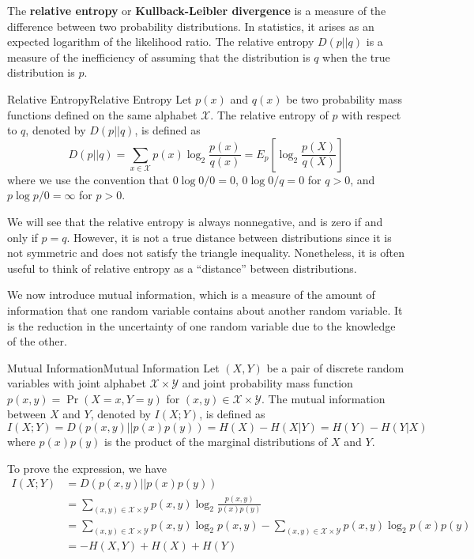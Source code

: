 \documentclass[../main.tex]{subfiles}
\begin{document}
The \textbf{relative entropy} or \textbf{Kullback-Leibler divergence} is a measure of the difference between two probability distributions. In statistics, it arises as an expected logarithm of the likelihood ratio. The relative entropy $D(p||q)$ is a measure of the inefficiency of assuming that the distribution is $q$ when the true distribution is $p$.

\begin{definition}{Relative Entropy}{Relative Entropy}
  Let $p(x)$ and $q(x)$ be two probability mass functions defined on the same alphabet $\mathcal{X}$. The relative entropy of $p$ with respect to $q$, denoted by $D(p||q)$, is defined as
  \begin{equation}
    D(p||q) = \sum_{x \in \mathcal{X}} p(x) \log_2 \frac{p(x)}{q(x)} = E_p \left[ \log_2 \frac{p(X)}{q(X)} \right]
  \end{equation}
  where we use the convention that $0 \log 0 / 0 = 0$, $0 \log 0 / q = 0$ for $q > 0$, and $p \log p / 0 = \infty$ for $p > 0$.
\end{definition}

We will see that the relative entropy is always nonnegative, and is zero if and only if $p = q$. However, it is not a true distance between distributions since it is not symmetric and does not satisfy the triangle inequality. Nonetheless, it is often useful to think of relative entropy as a ``distance'' between distributions. 

We now introduce mutual information, which is a measure of the amount of information that one random variable contains about another random variable. It is the reduction in the uncertainty of one random variable due to the knowledge of the other.

\begin{definition}{Mutual Information}{Mutual Information}
  Let $(X,Y)$ be a pair of discrete random variables with joint alphabet $\mathcal{X} \times \mathcal{Y}$ and joint probability mass function $p(x,y) = \Pr(X=x,Y=y)$ for $(x,y) \in \mathcal{X} \times \mathcal{Y}$. The mutual information between $X$ and $Y$, denoted by $I(X;Y)$, is defined as
  \begin{equation}
    I(X;Y) = D(p(x,y) || p(x)p(y)) = H(X) - H(X|Y) = H(Y) - H(Y|X)
  \end{equation}
  where $p(x)p(y)$ is the product of the marginal distributions of $X$ and $Y$.
\end{definition}

To prove the expression, we have
\begin{equation*}
  \begin{aligned}
    I(X;Y) &= D(p(x,y) || p(x)p(y))\\
           &= \sum_{(x,y) \in \mathcal{X} \times \mathcal{Y}} p(x,y) \log_2 \frac{p(x,y)}{p(x)p(y)}\\
           &= \sum_{(x,y) \in \mathcal{X} \times \mathcal{Y}} p(x,y) \log_2 p(x,y) - \sum_{(x,y) \in \mathcal{X} \times \mathcal{Y}} p(x,y) \log_2 p(x)p(y)\\
           &= -H(X,Y) + H(X) + H(Y)
  \end{aligned}
\end{equation*}
\end{document}
